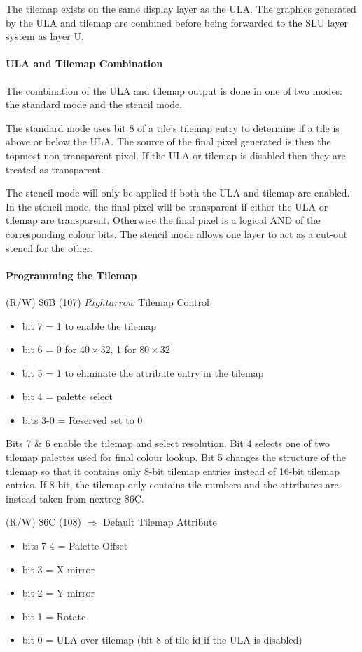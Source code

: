 The tilemap exists on the same display layer as the ULA. The graphics
generated by the ULA and tilemap are combined before being forwarded
to the SLU layer system as layer U.

\paragraph{ULA and Tilemap Combination}
The combination of the ULA and tilemap output is done in one of two modes: 
the standard mode and the stencil mode.

The standard mode uses bit 8 of a tile's tilemap entry to determine if
a tile is above or below the ULA. The source of the final pixel
generated is then the topmost non-transparent pixel.  If the ULA or
tilemap is disabled then they are treated as transparent.

The stencil mode will only be applied if both the ULA and tilemap are
enabled. In the stencil mode, the final pixel will be transparent if
either the ULA or tilemap are transparent. Otherwise the final pixel
is a logical AND of the corresponding colour bits. The stencil mode
allows one layer to act as a cut-out stencil for the other.

\paragraph{Programming the Tilemap}
(R/W) \$6B (107) $Rightarrow$ Tilemap Control
\begin{itemize}
\item bit 7 = 1 to enable the tilemap
\item bit 6 = 0 for $40\times32$, 1 for $80\times32$
\item bit 5 = 1 to eliminate the attribute entry in the tilemap
\item bit 4 = palette select
\item bits 3-0 = Reserved set to 0
\end{itemize}

Bits 7 \& 6 enable the tilemap and select resolution.  Bit 4 selects
one of two tilemap palettes used for final colour lookup.  Bit 5
changes the structure of the tilemap so that it contains only 8-bit
tilemap entries instead of 16-bit tilemap entries.  If 8-bit, the
tilemap only contains tile numbers and the attributes are instead
taken from nextreg \$6C.

(R/W) \$6C (108) $\Rightarrow$ Default Tilemap Attribute
\begin{itemize}
\item bits 7-4 = Palette Offset
\item bit 3 = X mirror
\item bit 2 = Y mirror
\item bit 1 = Rotate
\item bit 0 = ULA over tilemap (bit 8 of tile id if the ULA is disabled)
\end{itemize}

